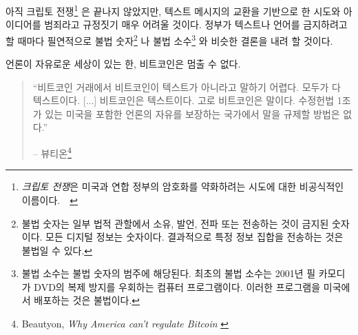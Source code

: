 아직 크립토 전쟁\footnote{\textit{크립토 전쟁}은 미국과 연합 정부의 암호화를 약화하려는 시도에 대한 비공식적인 이름이다.~\cite{eff-cryptowars}~\cite{wiki:cryptowars}} 
은 끝나지 않았지만, 
텍스트 메시지의 교환을 기반으로 한 시도와 아이디어를 범죄라고 규정짓기 매우 어려울 것이다.
정부가 텍스트나 언어를 금지하려고 할 때마다 필연적으로 불법 숫자\footnote{불법 숫자는 일부 법적 관할에서 소유, 발언, 전파 또는 전송하는 것이 금지된 숫자이다. 모든 디지털 정보는 숫자이다.
	결과적으로 특정 정보 집합을 전송하는 것은 불법일 수 있다.\cite{wiki:illegal-number}}
나 불법 소수\footnote{불법 소수는 불법 숫자의 범주에 해당된다. 최초의 불법 소수는 2001년 필 카모디가 DVD의 복제 방지를 우회하는 컴퓨터 프로그램이다. 이러한 프로그램을 미국에서 배포하는 것은 불법이다.\cite{wiki:illegal-prime}}
와 비슷한 결론을 내려 할 것이다.

언론이 자유로운 세상이 있는 한, 비트코인은 멈출 수 없다.

\begin{quotation}\begin{samepage}
		\enquote{비트코인 거래에서 비트코인이 텍스트가 아니라고 말하기 어렵다. 모두가 다 텍스트이다. [...]
			비트코인은 텍스트이다. 고로 비트코인은 말이다. 
			수정헌법 1조가 있는 미국을 포함한 언론의 자유를 보장하는 국가에서 말을 규제할 방법은 없다.}
		\begin{flushright} -- 뷰티온\footnote{Beautyon, \textit{Why America can't regulate
					Bitcoin} \cite{america-regulate-bitcoin}}
\end{flushright}\end{samepage}\end{quotation}


